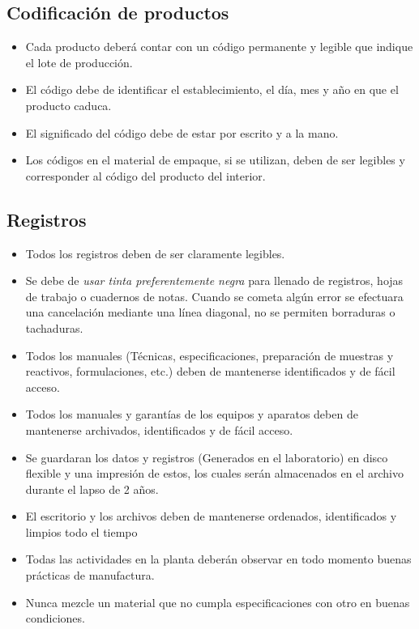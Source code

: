 \subsection{Codificación de productos}

\begin{itemize}
	\item Cada producto deberá contar con un código permanente y legible que indique el lote de producción.
	\item El código debe de identificar el establecimiento, el día, mes y año en que el producto caduca.
	\item El significado del código debe de estar por escrito y a la mano.
	\item Los códigos en el material de empaque, si se utilizan, deben de ser legibles y corresponder al código del producto del interior.
\end{itemize}

\subsection{Registros}

\begin{itemize}
	\item Todos los registros deben de ser claramente legibles.
	\item Se debe de \emph{usar tinta preferentemente negra} para llenado de registros, hojas de trabajo o cuadernos de notas. Cuando se cometa algún error se efectuara una cancelación mediante una línea diagonal, no se permiten borraduras o tachaduras.
	\item Todos los manuales (Técnicas, especificaciones, preparación de muestras y reactivos, formulaciones, etc.) deben de mantenerse identificados y de fácil acceso.
	\item Todos los manuales y garantías de los equipos y aparatos deben de mantenerse archivados, identificados y de fácil acceso.
	\item Se guardaran los datos y registros (Generados en el laboratorio) en disco flexible y una impresión de estos, los cuales serán almacenados en el archivo durante el lapso de 2 años.
	\item El escritorio y los archivos deben de mantenerse ordenados, identificados y limpios todo el tiempo
	\item Todas las actividades en la planta deberán observar en todo momento buenas prácticas de manufactura.
	\item Nunca mezcle un material que no cumpla especificaciones con otro en buenas condiciones.
\end{itemize}

